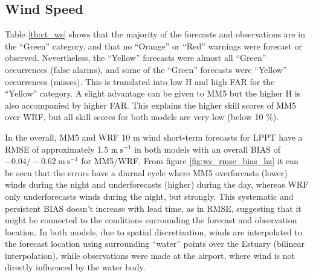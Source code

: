 \subsection{Wind Speed}

Table \ref{tb:ct_ws} shows that the majority of the forecasts and observations are in the “Green” category, and that no “Orange” or “Red” warnings were forecast or observed. Nevertheless, the “Yellow” forecasts were almost all “Green” occurrences (false alarms), and some of the “Green” forecasts were “Yellow” occurrences (misses). This is translated into low H and high FAR for the ``Yellow'' category. A slight advantage can be given to MM5 but the higher H is also accompanied by higher FAR. This explains the higher skill scores of MM5 over WRF, but all skill scores for both models are very low (below 10 \%).


In the overall, MM5 and WRF 10 m wind short-term forecasts for LPPT have a RMSE of approximately 1.5 $\mathrm{m\ s^{-1}}$ in both models with an overall BIAS of $-0.04/-0.62\mathrm{\ m\ s^{-1}}$ for MM5/WRF. From figure \ref{fig:ws_rmse_bias_hz} it can be seen that the errors have a diurnal cycle where MM5 overforcasts (lower) winds during the night and underforecasts (higher) during the day, whereas WRF only underforecasts winds during the night, but strongly. This systematic and persistent BIAS doesn't increase with lead time, as in RMSE, suggesting that it might be connected to the conditions surrounding the forecast and observation location. In both models, due to spatial discretization, winds are interpolated to the forecast location using surrounding ``water'' points over the Estuary (bilinear interpolation), while observations were made at the airport, where wind is not directly influenced by the water body.

